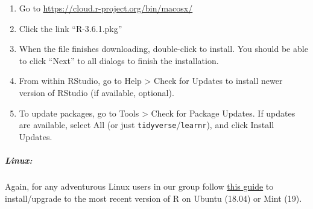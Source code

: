 \documentclass[]{article}
\providecommand{\tightlist}{%
  \setlength{\itemsep}{0pt}\setlength{\parskip}{0pt}}
\let\oldsubparagraph\subparagraph
\renewcommand{\subparagraph}[1]{\oldsubparagraph{#1}\mbox{}}
\begin{document}
\begin{enumerate}
\def\labelenumi{\arabic{enumi}.}
\tightlist
\item
  Go to \url{https://cloud.r-project.org/bin/macosx/}\\
\item
  Click the link ``R-3.6.1.pkg''\\
\item
  When the file finishes downloading, double-click to install. You
  should be able to click ``Next'' to all dialogs to finish the
  installation.\\
\item
  From within RStudio, go to Help \textgreater{} Check for Updates to
  install newer version of RStudio (if available, optional).\\
\item
  To update packages, go to Tools \textgreater{} Check for Package
  Updates. If updates are available, select All (or just
  \texttt{tidyverse}/\texttt{learnr}), and click Install Updates.
\end{enumerate}

\hypertarget{linux-1}{%
\subparagraph{Linux:}\label{linux-1}}

Again, for any adventurous Linux users in our group follow
\href{https://github.com/duckmayr/install-update-r-on-linux}{this guide}
to install/upgrade to the most recent version of R on Ubuntu (18.04) or
Mint (19).
\end{document}
